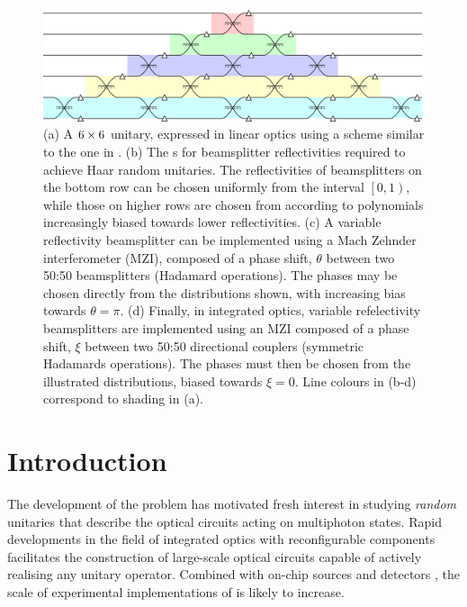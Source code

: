\begin{figure}[t]
  \includegraphics{figures/example}
  \caption[A $6 \by 6$ unitary, expressed in linear optics]
    {(a) A \(6 \by 6\) unitary, expressed in linear optics using a scheme
    similar to the one in \cite{reck}. (b) The \pdf{}s for
    beamsplitter reflectivities required to achieve Haar random unitaries.
    The reflectivities of beamsplitters on the
    bottom row can be chosen uniformly from the interval \(\left[ 0,1 \right)\),
    while those on higher rows are chosen from according to polynomials
    increasingly biased towards lower reflectivities. (c) A variable
    reflectivity beamsplitter can be implemented using a Mach Zehnder
    interferometer (MZI), composed of a phase shift, \(\theta\) between two
    50:50 beamsplitters (Hadamard operations). The phases may be chosen directly
    from the distributions shown, with increasing bias towards \(\theta=\pi\).
    (d) Finally, in integrated optics, variable refelectivity beamsplitters are
    implemented using an MZI composed of a phase shift, \(\xi\) between two
    50:50 directional couplers (symmetric Hadamards operations). The phases must
    then be chosen from the illustrated distributions, biased towards \(\xi=0\).
    Line colours in (b-d) correspond to shading in (a).}
  \label{fig:example}
\end{figure}

\section{Introduction}
\label{sec:DDIntro}
The development of the \bosonsampling{} problem \cite{bosonsampling} has
motivated fresh interest in studying \emph{random} unitaries that describe the
optical circuits acting on multiphoton states. Rapid developments in the field
of integrated optics with reconfigurable components facilitates the construction
of large-scale optical circuits capable of actively realising any unitary
operator. Combined with on-chip sources \cite{sources-josh} and detectors
\cite{detectors-munich, detectors-yale}, the scale of experimental
implementations of \bosonsampling{} \cite{bs-rome, bs-brisbane, bs-oxford,
bs-vienna} is likely to increase.


